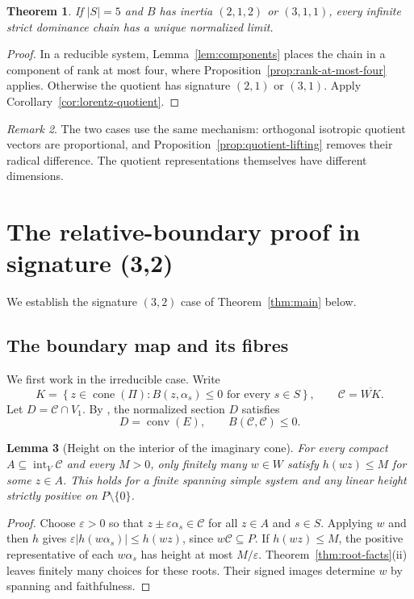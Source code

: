 \documentclass[11pt,reqno]{amsart}
\theoremstyle{plain}
\newtheorem{theorem}{Theorem}[section]
\newtheorem{lemma}[theorem]{Lemma}
\theoremstyle{definition}
\theoremstyle{remark}
\newtheorem{remark}[theorem]{Remark}
\numberwithin{equation}{section}
\begin{document}
\begin{theorem}\label{thm:rank5-lorentz-quotients}
If $|S|=5$ and $B$ has inertia $(2,1,2)$ or $(3,1,1)$, every infinite strict dominance chain has a unique normalized limit.
\end{theorem}
\begin{proof}
In a reducible system, Lemma~\ref{lem:components} places the chain in a component of rank at most four, where Proposition~\ref{prop:rank-at-most-four} applies. Otherwise the quotient has signature $(2,1)$ or $(3,1)$. Apply Corollary~\ref{cor:lorentz-quotient}.
\end{proof}

\begin{remark}
The two cases use the same mechanism: orthogonal isotropic quotient vectors are proportional, and Proposition~\ref{prop:quotient-lifting} removes their radical difference. The quotient representations themselves have different dimensions.
\end{remark}

\section{The relative-boundary proof in signature (3,2)}\label{sec:signature-32}

We establish the signature $(3,2)$ case of Theorem~\ref{thm:main} below.

\subsection{The boundary map and its fibres}\label{subsec:32-fibres}

We first work in the irreducible case. Write
\[
    K=
    \left\{
        z\in\operatorname{cone}(\Pi):
        B(z,\alpha_s)\leq0\text{ for every }s\in S
    \right\},
    \qquad
    \mathcal C=\overline{WK}.
\]
Let $D=\mathcal C\cap V_1$. By \cite[Theorem~2.2]{DHR}, the normalized section $D$ satisfies
\[
    D=\operatorname{conv}(E),
    \qquad
    B(\mathcal C,\mathcal C)\leq0.
\]

\begin{lemma}[Height on the interior of the imaginary cone]\label{lem:interior-height}
For every compact $A\subseteq\operatorname{int}_V\mathcal C$ and every
$M>0$, only finitely many $w\in W$ satisfy $h(wz)\le M$ for some
$z\in A$. This holds for a finite spanning simple system and any linear
height strictly positive on $P\setminus\{0\}$.
\end{lemma}
\begin{proof}
Choose $\varepsilon>0$ so that $z\pm\varepsilon\alpha_s\in\mathcal C$
for all $z\in A$ and $s\in S$. Applying $w$ and then $h$ gives
$\varepsilon|h(w\alpha_s)|\le h(wz)$, since $w\mathcal C\subseteq P$.
If $h(wz)\le M$, the positive representative of each $w\alpha_s$ has
height at most $M/\varepsilon$. Theorem~\ref{thm:root-facts}(ii)
leaves finitely many choices for these roots. Their signed images
determine $w$ by spanning and faithfulness.
\end{proof}
\end{document}
